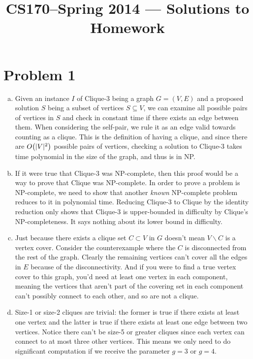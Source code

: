 \documentclass[11pt]{article}
\title{CS170--Spring 2014 --- Solutions to Homework \Homework}
\author{\Name}
\let\origleft\left
\let\origright\right
\renewcommand{\left}{\mathopen{}\mathclose\bgroup\origleft}
\renewcommand{\right}{\aftergroup\egroup\origright}
\newcommand{\p}[1]{\left(#1\right)}
\newcommand{\BigOh}[1]{O\p{#1}}
\begin{document}
\maketitle
{}
\setcounter{problemnumber}{0}

\section*{Problem 1}
\begin{enumerate}[(a)]
\item Given an instance $I$ of Clique-3 being a graph $G=(V,E)$ and a proposed solution $S$ being a subset of vertices $S \subseteq V$, we can examine all possible pairs of vertices in $S$ and check in constant time if there exists an edge between them. When considering the self-pair, we rule it as an edge valid towards counting as a clique. This is the definition of having a clique, and since there are $\BigOh{|V|^2}$ possible pairs of vertices, checking a solution to Clique-3 takes time polynomial in the size of the graph, and thus is in NP.
\item If it were true that Clique-3 was NP-complete, then this proof would be a way to prove that Clique was NP-complete. In order to prove a problem is NP-complete, we need to show that another \textit{known} NP-complete problem reduces to it in polynomial time. Reducing Clique-3 to Clique by the identity reduction only shows that Clique-3 is upper-bounded in difficulty by Clique's NP-completeness. It says nothing about its lower bound in difficulty.
\item Just because there exists a clique set $C\subset V$ in $G$ doesn't mean $V\backslash C$ is a vertex cover. Consider the counterexample where the $C$ is disconnected from the rest of the graph. Clearly the remaining vertices can't cover all the edges in $E$ because of the disconnectivity. And if you were to find a true vertex cover to this graph, you'd need at least one vertex in each component, meaning the vertices that aren't part of the covering set in each component can't possibly connect to each other, and so are not a clique.
\item Size-1 or size-2 cliques are trivial: the former is true if there exists at least one vertex and the latter is true if there exists at least one edge between two vertices. Notice there can't be size-5 or greater cliques since each vertex can connect to at most three other vertices. This means we only need to do significant computation if we receive the parameter $g=3$ or $g=4$. \\\\

\end{enumerate}
\end{document}

